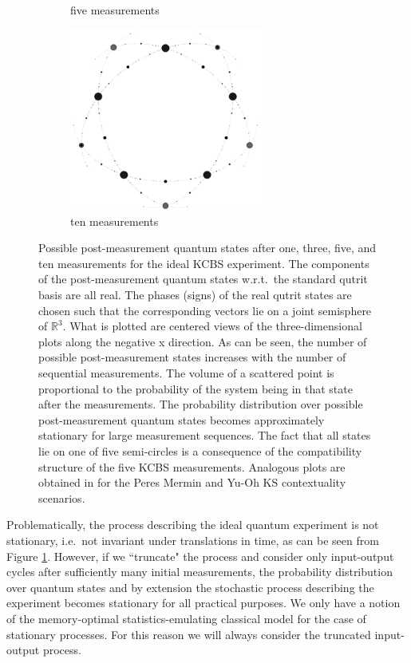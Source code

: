 \begin{figure}
\begin{subfigure}{0.5\textwidth}
            \caption{five measurements}
        \end{subfigure}
        \hfill
        \begin{subfigure}{0.5\textwidth}
            \centering 
            \includegraphics[width=0.7\textwidth]{images/n=5,mnts=10.png}
            \caption{ten measurements}
        \end{subfigure}
        \caption{Possible post-measurement quantum states after one, three, five, and ten measurements for the ideal KCBS experiment. The components of the post-measurement quantum states w.r.t.\ the standard qutrit basis are all real. The phases (signs) of the real qutrit states are chosen such that the corresponding vectors lie on a joint semisphere of $\mathbb{R}^3$. What is plotted are centered views of the three-dimensional plots along the negative x direction. As can be seen, the number of possible post-measurement states increases with the number of sequential measurements. The volume of a scattered point is proportional to the probability of the system being in that state after the measurements. The probability distribution over possible post-measurement quantum states becomes approximately stationary for large measurement sequences. The fact that all states lie on one of five semi-circles is a consequence of the compatibility structure of the five KCBS measurements. Analogous plots are obtained in \cite{Cabello2018} for the Peres Mermin and Yu-Oh KS contextuality scenarios.}
        \label{fig:causalstates}
    \end{figure}

Problematically, the process describing the ideal quantum experiment is not stationary, i.e.\ not invariant under translations in time, as can be seen from Figure \ref{fig:causalstates}. However, if we ``truncate" the process and consider only input-output cycles after sufficiently many initial measurements, the probability distribution over quantum states and by extension the stochastic process describing the experiment becomes stationary for all practical purposes. We only have a notion of the memory-optimal statistics-emulating classical model for the case of stationary processes. For this reason we will always consider the truncated input-output process.

